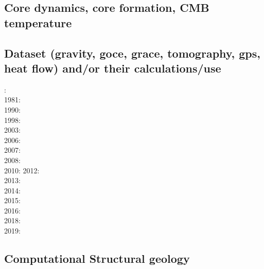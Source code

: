 \subsection*{Core dynamics, core formation, CMB temperature}
 

\noindent
\cite{hayu96}
\cite{nata04c}
\cite{lahb08}\cite{gost08}\cite{sata08}
\cite{kisn09}
\cite{nata10}\cite{lamg10}\cite{sate10}
\cite{cobu12}
\cite{nata13}
\cite{yiym19}

\subsection*{Dataset (gravity, goce, grace, tomography, gps, heat flow) 
and/or their calculations/use}
   
 

: \cite{rola77}\\
1981: \cite{dzan81}\\
1990: \cite{lips90}\\
1998: \cite{bisp98}\\
2003: \cite{krhh03}\cite{sosi03}\cite{pimo03}\\
2006: \cite{masr06}\\
2007: \cite{mitk07}\cite{lobc07}\cite{rimb07}\\
2008: \cite{zhou08}\cite{zhou08}\\
2010: \cite{dada10}
2012: \cite{hawj12}\cite{resa12}\cite{hawj12}\cite{fesw12}\\
2013: \cite{ress13}\cite{ebbf13}\cite{davi13}\\
2014: \cite{paml14}\cite{ebbf14}\cite{krbk14}\\
2015: \cite{boem15}\cite{brrs15}\\
2016: \cite{kord16}\cite{moek16}\\
2018: \cite{pabn18}\cite{hamp18}\\
2019: \cite{sopg19}

\subsection*{Computational Structural geology}


